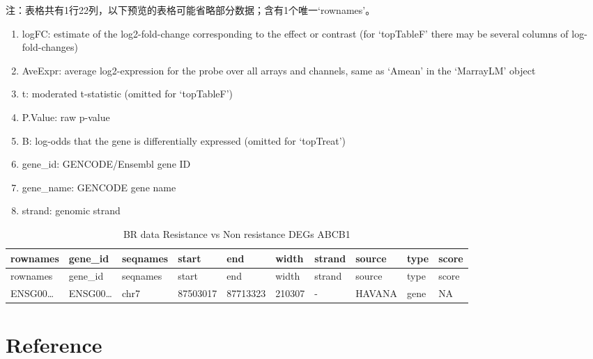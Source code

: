 \documentclass[
]{article}
\providecommand{\tightlist}{%
  \setlength{\itemsep}{0pt}\setlength{\parskip}{0pt}}
\begin{document}
\begin{center}\begin{tcolorbox}[colback=gray!10, colframe=gray!50, width=0.9\linewidth, arc=1mm, boxrule=0.5pt]注：表格共有1行22列，以下预览的表格可能省略部分数据；含有1个唯一`rownames'。
\end{tcolorbox}
\end{center}
\begin{center}\begin{tcolorbox}[colback=gray!10, colframe=gray!50, width=0.9\linewidth, arc=1mm, boxrule=0.5pt]\begin{enumerate}\tightlist
\item logFC:  estimate of the log2-fold-change corresponding to the effect or contrast (for ‘topTableF’ there may be several columns of log-fold-changes)
\item AveExpr:  average log2-expression for the probe over all arrays and channels, same as ‘Amean’ in the ‘MarrayLM’ object
\item t:  moderated t-statistic (omitted for ‘topTableF’)
\item P.Value:  raw p-value
\item B:  log-odds that the gene is differentially expressed (omitted for ‘topTreat’)
\item gene\_id:  GENCODE/Ensembl gene ID
\item gene\_name:  GENCODE gene name
\item strand:  genomic strand
\end{enumerate}\end{tcolorbox}
\end{center}

\begin{longtable}[]{@{}llllllllll@{}}
\caption{\label{tab:BR-data-Resistance-vs-Non-resistance-DEGs-ABCB1}BR data Resistance vs Non resistance DEGs ABCB1}\tabularnewline
\toprule
rownames & gene\_id & seqnames & start & end & width & strand & source & type & score\tabularnewline
\midrule
\endfirsthead
\toprule
rownames & gene\_id & seqnames & start & end & width & strand & source & type & score\tabularnewline
\midrule
\endhead
ENSG00\ldots{} & ENSG00\ldots{} & chr7 & 87503017 & 87713323 & 210307 & - & HAVANA & gene & NA\tabularnewline
\bottomrule
\end{longtable}

\hypertarget{bibliography}{%
\section*{Reference}\label{bibliography}}
\end{document}
